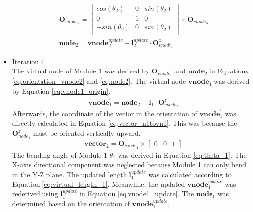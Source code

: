 \begin{itemize}
\begin{align}
        &\textbf{O}_{vnode_2} =     
        \begin{bmatrix}
            cos(\theta_2) & 0 & sin(\theta_2) \\
            0 & 1 & 0 \\
            -sin(\theta_2) & 0 & sin(\theta_2) \\
        \end{bmatrix}  
        \times \textbf{O}_{vnode_3}
        \label{eq:orientation_vnode2} \\
        &\textbf{node}_2 = \textbf{vnode}_{2}^{update} - \textbf{l}_{2}^{update} \cdot \textbf{O}_{vnode_2}^{z}
        \label{eq:node2} 
    \end{align}
    \vspace{-15mm}
    \item Iteration 4 \\ %
    The virtual node of Module 1 was derived by $\textbf{O}_{vnode_2}$ and $\textbf{node}_{2}$ in Equations 
    \ref{eq:orientation_vnode2} and \ref{eq:node2}. The virtual node $\textbf{vnode}_{1}$ was derived by Equation 
    \ref{eq:vnode1_origin}.
    \vspace{-5mm}
    \begin{align}
        &\textbf{vnode}_{1}^{'} = \textbf{node}_{2} - \textbf{l}_{1} \cdot \textbf{O}_{vnode_2}^{z}
        \label{eq:vnode1_origin}
    \end{align}
    Afterwards, the coordinate of the vector in the orientation of $\textbf{vnode}_{1}^{'}$ was directly calculated 
    in Equation \ref{eq:vector_n1tovn1}. This was because the $\textbf{O}_{node_1}^{z}$ must be oriented vertically upward.
    \vspace{-5mm}
    \begin{align}
        &\textbf{vector}_{2} = \textbf{O}_{vnode_1} \times \begin{bmatrix} 0 & 0 & 1 \end{bmatrix} 
        \label{eq:vector_n1tovn1} 
    \end{align}
    The bending angle of Module 1 $\theta_1$ was derived in Equation \ref{eq:theta_1}. The X-axis directional 
    component was neglected because Module 1 can only bend in the Y-Z plane. The updated length $\textbf{l}_{1}^{update}$ 
    was calculated according to Equation \ref{eq:virtual_length_1}. Meanwhile, the updated 
    $\textbf{vnode}_{1}^{update}$ was rederived using $\textbf{l}_{1}^{update}$ in Equation \ref{eq:vnode1_update}. 
    The $\textbf{node}_1$ was determined based on the orientation of $\textbf{vnode}_{1}^{update}$, 

\end{itemize}
